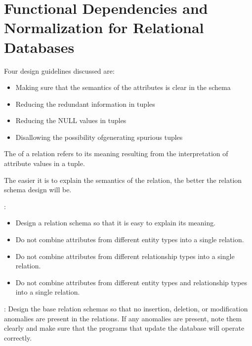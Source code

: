 \chapter{Functional Dependencies and Normalization for Relational Databases}


  \par Four design guidelines discussed are:

  \begin{itemize}
    \item Making sure that the semantics of the attributes is clear in the schema
    \item Reducing the redundant information in tuples
    \item Reducing the NULL values in tuples
    \item Disallowing the possibility ofgenerating spurious tuples
  \end{itemize}

    \par The  of a relation refers to its meaning resulting from the interpretation of attribute values in a tuple.
    \par The easier it is to explain the semantics of the relation, the better the relation schema design will be.
    \par {}:
    \begin{itemize}
      \item Design a relation schema so that it is easy to explain its meaning.
      \item Do not combine attributes from different entity types into a single relation.
      \item Do not combine attributes from different relationship types into a single relation.
      \item Do not combine attributes from different entity types and relationship types into a single relation.
    \end{itemize}

    \par {}: Design the base relation schemas so that no insertion, deletion, or modification anomalies are present in the relations. If any anomalies are present, note them clearly and make sure that the programs that update the database will operate correctly.
